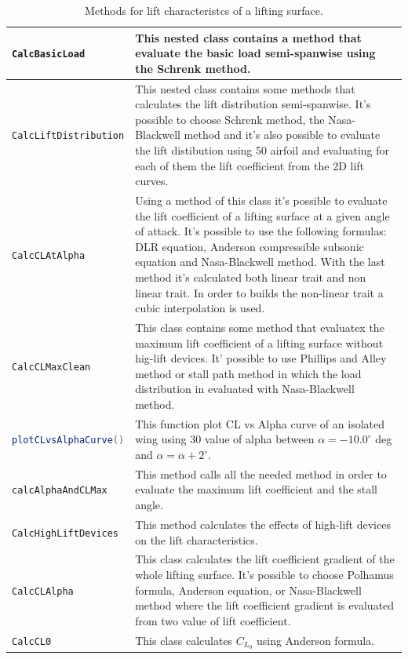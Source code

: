 \begin{table}[H]
\begin{tabular}{p{7cm}p{7.5cm}}
\toprule
\lstinline[language=Java]!CalcBasicLoad! & This nested class contains a method that evaluate the basic load semi-spanwise using the Schrenk method.\\ \hline 
\lstinline[language=Java]!CalcLiftDistribution! &This nested class contains some methods that calculates the lift distribution semi-spanwise. It's possible to choose Schrenk method, the Nasa-Blackwell method and it's also possible to evaluate the lift distibution using 50 airfoil and evaluating for each of them the lift coefficient from the 2D lift curves. \\ \hline 
\lstinline[language=Java]!CalcCLAtAlpha! & Using a method of this class it's possible to evaluate the lift coefficient of a lifting surface at a given angle of attack. It's possible to use the following formulas: DLR equation, Anderson compressible subsonic equation and Nasa-Blackwell method. With the last method it's calculated both linear trait and non linear trait. In order to builds the non-linear trait a cubic interpolation is used.\\ \hline 
\lstinline[language=Java]!CalcCLMaxClean! &This class contains some method that evaluatex the maximum lift coefficient of a lifting surface without hig-lift devices. It' possible to use Phillips and Alley method or stall path method in which the load distribution in evaluated with Nasa-Blackwell method.\\ \hline 
\lstinline[language=Java]!plotCLvsAlphaCurve()! & This function plot CL vs Alpha curve of an isolated wing using 30 value of alpha between $\alpha = - 10.0^{\circ}$  deg and  $\alpha = \alpha + 2^{\circ}$.\\ \hline 
\lstinline[language=Java]!calcAlphaAndCLMax! & This method calls all the needed method in order to evaluate the maximum lift coefficient and the stall angle.\\ \hline 
\lstinline[language=Java]!CalcHighLiftDevices! & This method calculates the effects of high-lift devices on the lift characteristics.\\ \hline 
\lstinline[language=Java]!CalcCLAlpha! & This class calculates the lift coefficient gradient of the whole lifting surface. It's possible to choose Polhamus formula,  Anderson equation, or Nasa-Blackwell method where the lift coefficient gradient is evaluated from two value of lift coefficient.\\ \hline 
\lstinline[language=Java]!CalcCL0! & This class calculates $C_{L_0}$ using Anderson formula.\\ \hline 
\bottomrule
\end{tabular}
\caption{Methods for lift characteristcs of a lifting surface.}
\label{table:Table2}
\end{table}

